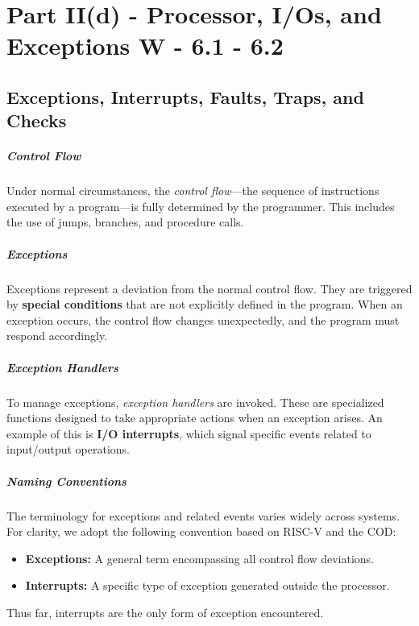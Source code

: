 \chapter{Part II(d) - Processor, I/Os, and Exceptions W - 6.1 - 6.2}

\section{Exceptions, Interrupts, Faults, Traps, and Checks}

\paragraph{Control Flow}
Under normal circumstances, the \textit{control flow}—the sequence of instructions executed by a program—is fully determined by the programmer. This includes the use of jumps, branches, and procedure calls.

\paragraph{Exceptions}
Exceptions represent a deviation from the normal control flow. They are triggered by \textbf{special conditions} that are not explicitly defined in the program. When an exception occurs, the control flow changes unexpectedly, and the program must respond accordingly.

\paragraph{Exception Handlers}
To manage exceptions, \textit{exception handlers} are invoked. These are specialized functions designed to take appropriate actions when an exception arises. An example of this is \textbf{I/O interrupts}, which signal specific events related to input/output operations.

\paragraph{Naming Conventions}
The terminology for exceptions and related events varies widely across systems. For clarity, we adopt the following convention based on RISC-V and the COD:
\begin{itemize}
    \item \textbf{Exceptions:} A general term encompassing all control flow deviations.
    \item \textbf{Interrupts:} A specific type of exception generated outside the processor.
\end{itemize}
Thus far, interrupts are the only form of exception encountered.
\newpage
